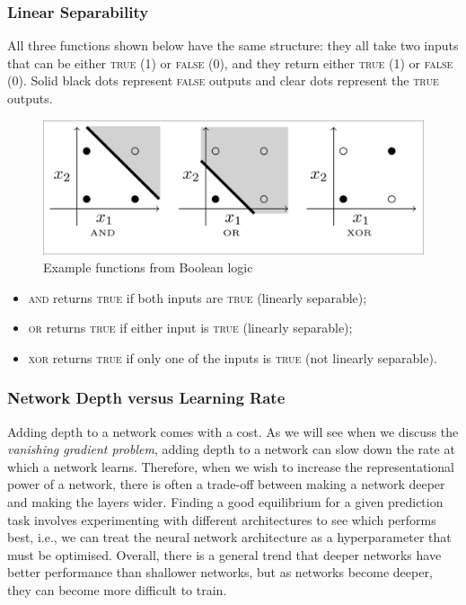 \documentclass[a4paper,11pt]{article}
\begin{document}
\subsubsection{Linear Separability}
All three functions shown below have the same structure: they all take two inputs that can be either \textsc{true} (1) or \textsc{false} (0), and they return either \textsc{true} (1) or \textsc{false} (0).
Solid black dots represent \textsc{false} outputs and clear dots represent the \textsc{true} outputs.

\begin{figure}[H]
    \centering
    \includegraphics[width=\textwidth]{images/linearseparability.png}
    \caption{ Example functions from Boolean logic }
\end{figure}

\begin{itemize}
    \item   \textsc{and} returns \textsc{true} if both inputs are \textsc{true} (linearly separable);
    \item   \textsc{or} returns \textsc{true} if either input is \textsc{true} (linearly separable);
    \item   \textsc{xor} returns \textsc{true} if only one of the inputs is \textsc{true} (not linearly separable).
\end{itemize}

\subsubsection{Network Depth versus Learning Rate}
Adding depth to a network comes with a cost.
As we will see when we discuss the \textit{vanishing gradient problem}, adding depth to a network can slow down the rate at which a network learns.
Therefore, when we wish to increase the representational power of a network, there is often a trade-off between making a network deeper and making the layers wider.
Finding a good equilibrium for a given prediction task involves experimenting with different architectures to see which performs best, i.e., we can treat the neural network architecture as a hyperparameter that must be optimised.
Overall, there is a general trend that deeper networks have better performance than shallower networks, but as networks become deeper, they can become more difficult to train.
\end{document}
